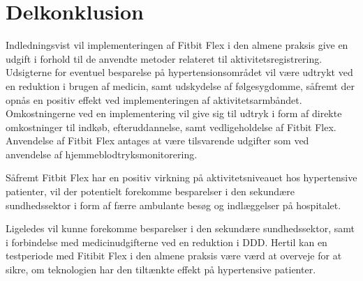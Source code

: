 \section{Delkonklusion}

Indledningsvist vil implementeringen af Fitbit Flex i den almene praksis give en udgift i forhold til de anvendte metoder relateret til aktivitetsregistrering. Udsigterne for eventuel besparelse på hypertensionsområdet vil være udtrykt ved en reduktion i brugen af medicin, samt udskydelse af følgesygdomme, såfremt der opnås en positiv effekt ved implementeringen af aktivitetsarmbåndet. Omkostningerne ved en implementering vil give sig til udtryk i form af direkte omkostninger til indkøb, efteruddannelse, samt vedligeholdelse af Fitbit Flex. Anvendelse af Fitbit Flex antages at være tilsvarende udgifter som ved anvendelse af hjemmeblodtryksmonitorering. 

Såfremt Fitbit Flex har en positiv virkning på aktivitetsniveauet hos hypertensive patienter, vil der potentielt forekomme besparelser i den sekundære sundhedssektor i form af færre ambulante besøg og indlæggelser på hospitalet.

Ligeledes vil kunne forekomme besparelser i den sekundære sundhedssektor, samt i forbindelse med medicinudgifterne ved en reduktion i DDD. Hertil kan en testperiode med Fitibit Flex i den almene praksis være værd at overveje for at sikre, om teknologien har den tiltænkte effekt på hypertensive patienter.  